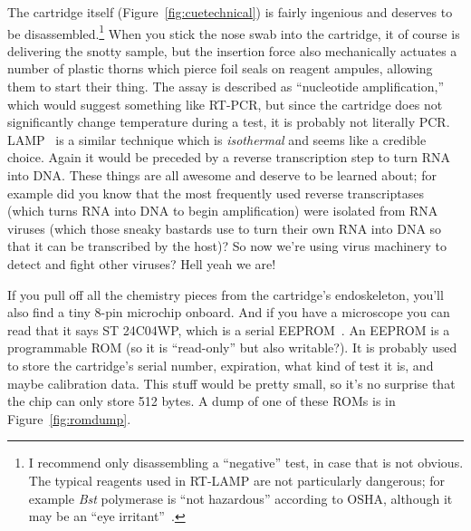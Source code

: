 \documentclass[twocolumn]{article}
\begin{document}
The cartridge itself (Figure~\ref{fig:cuetechnical}) is fairly
ingenious and deserves to be disassembled.\footnote{I recommend only
  disassembling a ``negative'' test, in case that is not obvious. The
  typical reagents used in RT-LAMP are not particularly dangerous; for
  example
  {\it Bst} polymerase is ``not hazardous'' according to OSHA,
  although it may be an ``eye irritant''~\cite{neb2019bst}.} When you
stick the nose swab into the cartridge, it of course is delivering the
snotty sample, but the insertion force also mechanically actuates a
number of plastic thorns which pierce foil seals on reagent ampules,
allowing them to start their thing. The assay is described as
``nucleotide amplification,'' which would suggest something like
RT-PCR, but since the cartridge does not significantly change
temperature during a test, it is probably not literally PCR.
LAMP~\cite{notomi2000loop} is a similar technique which is {\em
  isothermal} and seems like a credible choice. Again it would be
preceded by a reverse transcription step to turn RNA into DNA. These
things are all awesome and deserve to be learned about; for example
did you know that the most frequently used reverse transcriptases
(which turns RNA into DNA to begin amplification) were isolated from
RNA viruses (which those sneaky bastards use to turn their own RNA
into DNA so that it can be transcribed by the host)? So now we're
using virus machinery to detect and fight other viruses? Hell yeah we
are!

If you pull off all the chemistry pieces from the cartridge's
endoskeleton, you'll also find a tiny 8-pin microchip onboard. And if
you have a microscope you can read that it says ST 24C04WP, which is a
serial EEPROM~\cite{stm24c0w}. An EEPROM is a programmable ROM (so it
is ``read-only'' but also writable?). It is probably used to store the
cartridge's serial number, expiration, what kind of test it is, and
maybe calibration data. This stuff would be pretty small, so it's no
surprise that the chip can only store 512 bytes. A dump of one of
these ROMs is in Figure~\ref{fig:romdump}.
\end{document}
